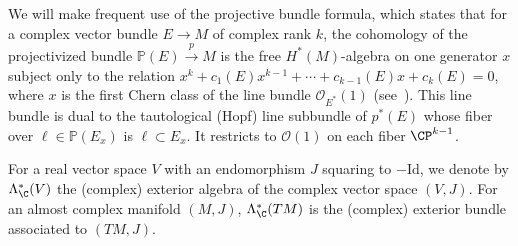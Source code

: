 We will make frequent use of the projective bundle formula, which states that for a complex vector bundle $E \to M$ of complex rank $k$, the cohomology of the projectivized bundle $\mathbb{P}(E) \xrightarrow{p} M$ is the free $H^*(M)$-algebra on one generator $x$ subject only to the relation $x^k + c_1(E)x^{k-1} + \cdots + c_{k-1}(E)x + c_k(E) = 0$, where $x$ is the first Chern class of the line bundle $\mathcal{O}_{E^*}(1)$ (see~\cite[Definition~15.13]{D12}). This line bundle is dual
to the tautological (Hopf) line subbundle of $p^*(E)$ whose fiber over $\ell \in \mathbb{P}(E_x)$ is $\ell \subset E_x$. It restricts to $\mathcal{O}(1)$ on each fiber $\CP^{k-1}$.

For a real vector space $V$ with an endomorphism $J$ squaring to $-\mathrm{Id}$, we denote by $\Lambda_\C^*(V)$ the (complex) exterior algebra of the complex vector space $(V,J)$. For an almost complex manifold $(M,J)$, $\Lambda_\C^\ast (TM)$ is the (complex) exterior bundle associated to $(TM,J)$.

